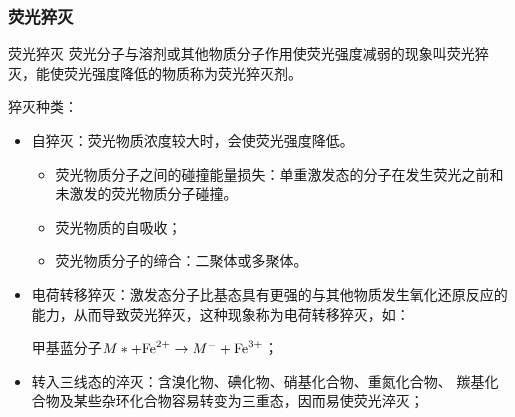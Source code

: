 \subsubsection{荧光猝灭}
\begin{definition*}{荧光猝灭}
	荧光分子与溶剂或其他物质分子作用使荧光强度减弱的现象叫荧光猝灭，能使荧光强度降低的物质称为荧光猝灭剂。
\end{definition*}
猝灭种类：
\begin{itemize}
	\item 自猝灭：荧光物质浓度较大时，会使荧光强度降低。
	\begin{itemize}
		\item 荧光物质分子之间的碰撞能量损失：单重激发态的分子在发生荧光之前和未激发的荧光物质分子碰撞。
		\item 荧光物质的自吸收；
		\item 荧光物质分子的缔合：二聚体或多聚体。
	\end{itemize}
	\item 电荷转移猝灭：激发态分子比基态具有更强的与其他物质发生氧化还原反应的能力，从而导致荧光猝灭，这种现象称为电荷转移猝灭，如：
	
	甲基蓝分子$M*+\ce{Fe^{2+}} \rightarrow M^{-}+\ce{Fe^{3+}}$；
	\item 转入三线态的淬灭：含溴化物、碘化物、硝基化合物、重氮化合物、 羰基化合物及某些杂环化合物容易转变为三重态，因而易使荧光淬灭；
\end{itemize}

